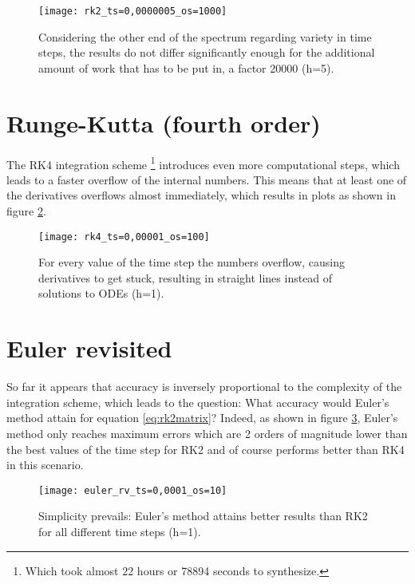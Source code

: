 \begin{figure}[p]
	\centering
	\texttt{[image: rk2\_ts=0,0000005\_os=1000]}
	\caption{Considering the other end of the spectrum regarding variety in time steps, the results do not differ significantly enough for the additional amount of work that has to be put in, a factor 20000 (h=5).}
	\label{f:rk2_ts=0,0000005_os=1000}
\end{figure}

\section{Runge-Kutta (fourth order)}
The RK4 integration scheme \footnote{Which took almost 22 hours or 78894 seconds to synthesize.} introduces even more computational steps, which leads to a faster overflow of the internal numbers. This means that at least one of the derivatives overflows almost immediately, which results in plots as shown in figure \ref{f:rk4_ts=0,00001_os=100}.


\begin{figure}[h]
	\centering
	\texttt{[image: rk4\_ts=0,00001\_os=100]}
	\caption{For every value of the time step the numbers overflow, causing derivatives to get stuck, resulting in straight lines instead of solutions to ODEs (h=1).}
	\label{f:rk4_ts=0,00001_os=100}
\end{figure}

\section{Euler revisited}
So far it appears that accuracy is inversely proportional to the complexity of the integration scheme, which leads to the question: What accuracy would Euler's method attain for equation \ref{eq:rk2matrix}? Indeed, as shown in figure \ref{f:euler_rv_ts=0,0001_os=10}, Euler's method only reaches maximum errors which are 2 orders of magnitude lower than the best values of the time step for RK2 and of course performs better than RK4 in this scenario. 

\begin{figure}[h]
	\centering
	\texttt{[image: euler\_rv\_ts=0,0001\_os=10]}
	\caption{Simplicity prevails: Euler's method attains better results than RK2 for all different time steps (h=1).}
	\label{f:euler_rv_ts=0,0001_os=10}
\end{figure}




